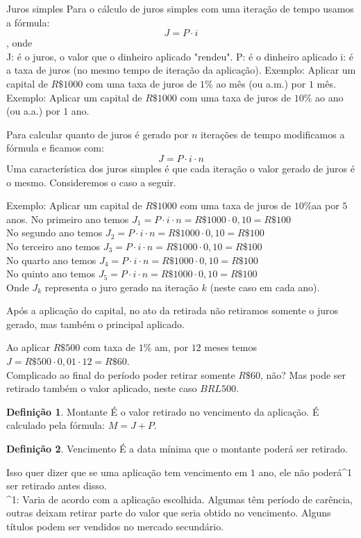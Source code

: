 \documentclass{book}
\theoremstyle{definition}
\newtheorem{definition}{Definição}
\theoremstyle{remark}
\theoremstyle{plain}
\theoremstyle{plain}
\theoremstyle{plain}
\begin{document}
    Juros simples
    Para o cálculo de juros simples com uma iteração de tempo usamos a fórmula:
    $$J = P \cdot i$$, onde \\
    J: é o juros, o valor que o dinheiro aplicado "rendeu".
    P: é o dinheiro aplicado
    i: é a taxa de juros (no mesmo tempo de iteração da aplicação).
    Exemplo: Aplicar um capital de $R\$ 1000 $ com uma taxa de juros de $1\%$ ao mês (ou a.m.) por $1$ mês.
    Exemplo: Aplicar um capital de $R\$ 1000 $ com uma taxa de juros de $10\%$ ao ano (ou a.a.) por $1$ ano.
    
    Para calcular quanto de juros é gerado por $n$ iterações 
    de tempo modificamos a fórmula e ficamos com:
    $$J = P \cdot i \cdot n$$
    Uma característica dos juros simples é que cada iteração o valor gerado de juros é o mesmo. 
    Consideremos o caso a seguir.

    Exemplo: Aplicar um capital de $R\$ 1000 $ com uma taxa de juros de $10\%$aa por $5$ anos.
    No primeiro ano temos $J_1 = P \cdot i \cdot n = R\$ 1000 \cdot 0,10 = R\$ 100$ \\
    No segundo ano temos $J_2 = P \cdot i \cdot n = R\$ 1000 \cdot 0,10 = R\$ 100$ \\
    No terceiro ano temos $J_3 = P \cdot i \cdot n = R\$ 1000 \cdot 0,10 = R\$ 100$ \\
    No quarto ano temos $J_4 = P \cdot i \cdot n = R\$ 1000 \cdot 0,10 = R\$ 100$ \\
    No quinto ano temos $J_5 = P \cdot i \cdot n = R\$ 1000 \cdot 0,10 = R\$ 100$ \\
    Onde $J_k$ representa o juro gerado na iteração $k$ (neste caso em cada ano).

    Após a aplicação do capital, no ato da retirada não retiramos
    somente o juros gerado, mas também o principal aplicado.
    \begin{example}
        Ao aplicar $R\$ 500$ com taxa de $1\%$ am, por $12$ meses temos $J = R\$ 500 \cdot 0,01 \cdot 12 = R\$ 60 $. \\
        Complicado ao final do período poder retirar somente $R\$ 60$, não? Mas pode ser 
        retirado também o valor aplicado, neste caso $BRL 500$.
    \end{example}
    \begin{definition}{Montante}
        É o valor retirado no vencimento da aplicação. É calculado pela fórmula: $M = J + P$.
    \end{definition}
    \begin{definition}{Vencimento}
        É a data mínima que o montante poderá ser retirado.
    \end{definition}
    Isso quer dizer que se uma aplicação tem vencimento em $1$ ano, ele não poderá^1 ser retirado antes disso. \\
    ^1: Varia de acordo com a aplicação escolhida. Algumas têm período de carência, outras deixam retirar 
    parte do valor que seria obtido no vencimento. Alguns títulos podem ser vendidos no mercado secundário.
    
\end{document}
